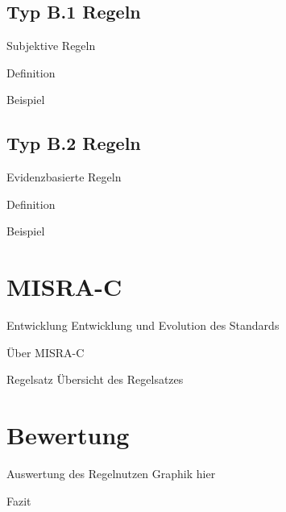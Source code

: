 \documentclass{beamer}
\begin{document}
    \subsection{Typ B.1 Regeln}
    \label{subsec:typ-b-1-regeln}
    \begin{frame}{Subjektive Regeln}
        \begin{block}{Definition}

        \end{block}
        \begin{exampleblock}{Beispiel}
            
        \end{exampleblock}
    \end{frame}

    \subsection{Typ B.2 Regeln}
    \label{subsec:typ-b-2-regeln}
    \begin{frame}{Evidenzbasierte Regeln}
        \begin{block}{Definition}

        \end{block}
        \begin{exampleblock}{Beispiel}
            
        \end{exampleblock}
    \end{frame}

    \section{MISRA-C}
    \label{sec:misra-c}
    \begin{frame}{Entwicklung}
        Entwicklung und Evolution des Standards
    \end{frame}

    \begin{frame}{Über MISRA-C}

    \end{frame}

    \begin{frame}{Regelsatz}
        Übersicht des Regelsatzes
    \end{frame}

    \section{Bewertung}
    \label{sec:bewertung}
    \begin{frame}{Auswertung des Regelnutzen}
        Graphik hier
    \end{frame}

    \begin{frame}{Fazit}

    \end{frame}
\end{document}
